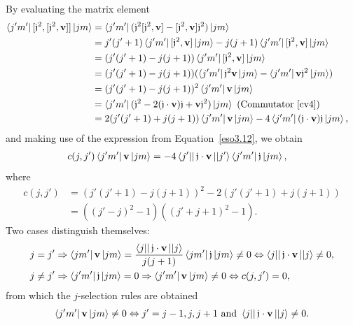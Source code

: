 \documentclass[12pt,a4paper]{report}
\theoremstyle{definition}
\theoremstyle{remark}
\theoremstyle{remark}
\begin{document}
By evaluating the matrix element
\begin{align*}
\bra{j'm'}[\mathfrak{j}^2,[\mathfrak{j}^2,\textbf{v}]]\ket{jm}&=\bra{j'm'}(\mathfrak{j}^2[\mathfrak{j}^2,\mathbf{v}]-[\mathfrak{j}^2,\mathbf{v}]\mathfrak{j}^2)\ket{jm}\\
&=j'(j'+1)\bra{j'm'}[\mathfrak{j}^2,\mathbf{v}]\ket{jm}-j(j+1)\bra{j'm'}[\mathfrak{j}^2,\mathbf{v}]\ket{jm}\\
&=(j'(j'+1)-j(j+1))\bra{j'm'}[\mathfrak{j}^2,\mathbf{v}]\ket{jm}\\
&=(j'(j'+1)-j(j+1))(\bra{j'm'}\mathfrak{j}^2\mathbf{v}\ket{jm}-\bra{j'm'}\mathbf{v}\mathfrak{j}^2\ket{jm})\\
&=(j'(j'+1)-j(j+1))^2\bra{j'm'}\mathbf{v}\ket{jm}
&\\
&=\bra{j'm'}(\mathfrak{j}^2-2(\mathfrak{j}\cdot\mathbf{v})\mathfrak{j}+\mathbf{v}\mathfrak{j}^2)\ket{jm} \text{ (Commutator~\ref{cv4})}\\
&=2(j'(j'+1)+j(j+1))\bra{j'm'}\mathbf{v}\ket{jm}-4\bra{j'm'}(\mathfrak{j}\cdot\mathbf{v})\mathfrak{j}\ket{jm},
\end{align*}
and making use of the expression from Equation~\ref{eso3.12}, we obtain
\begin{align*}
&c(j,j')\bra{j'm'}\mathbf{v}\ket{jm}=-4\bra{j'|}\mathfrak{j}\cdot\mathbf{v}\ket{|j'}\bra{j'm'}\mathfrak{j}\ket{jm},
\end{align*}
where
\begin{align*}
c(j,j')&=(j'(j'+1)-j(j+1))^2-2(j'(j'+1)+j(j+1))\\
&=((j'-j)^2-1)((j'+j+1)^2-1).
\end{align*}
Two cases distinguish themselves:
\begin{align*}
j=j'&\Rightarrow \bra{jm'}\mathbf{v}\ket{jm}=\frac{\bra{j|}\mathfrak{j}\cdot\mathbf{v}\ket{|j}}{j(j+1)}\bra{jm'}\mathfrak{j}\ket{jm}\neq 0 \Leftrightarrow \bra{j|}\mathfrak{j}\cdot\mathbf{v}\ket{|j}\neq 0,\\
j\neq j' &\Rightarrow \bra{j'm'}\mathfrak{j}\ket{jm}=0 \Rightarrow \bra{j'm'}\mathbf{v}\ket{jm}\neq 0 \Leftrightarrow c(j,j')=0,
\end{align*}
from which the $j$-selection rules are obtained
\begin{equation}\label{eso3.15}
\begin{aligned}
\bra{j'm'}\mathbf{v}\ket{jm}\neq 0 \Leftrightarrow j'=j-1,j,j+1 \text{ and }\bra{j|}\mathfrak{j}\cdot\mathbf{v}\ket{|j}\neq 0.
\end{aligned}
\end{equation}
\end{document}

